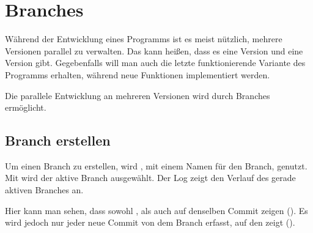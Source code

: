 \section{Branches}\label{sec:branch}
Während der Entwicklung eines Programms ist es meist nützlich, mehrere Versionen parallel zu verwalten. Das kann heißen, dass es eine  Version und eine  Version gibt. Gegebenfalls will man auch die letzte funktionierende Variante des Programms erhalten, während neue Funktionen implementiert werden.

Die parallele Entwicklung an mehreren Versionen wird durch Branches ermöglicht.
\subsection{Branch erstellen}
Um einen Branch zu erstellen, wird , mit einem Namen für den Branch, genutzt. Mit  wird der aktive Branch ausgewählt. Der Log zeigt den Verlauf des gerade aktiven Branches an.
Hier kann man sehen, dass sowohl , als auch  auf denselben Commit zeigen (). Es wird jedoch nur jeder neue Commit  von dem Branch erfasst, auf den  zeigt ().


